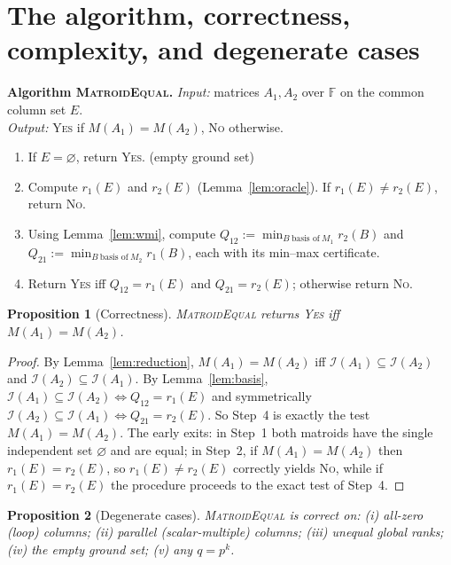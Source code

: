 \documentclass{amsart}
\theoremstyle{plain}
\newtheorem{proposition}{Proposition}
\theoremstyle{definition}
\newcommand{\I}{\mathcal{I}}
\newcommand{\F}{\mathbb{F}}
\begin{document}
\section{The algorithm, correctness, complexity, and degenerate cases}\label{sec:algorithm}

\noindent\textbf{Algorithm \textsc{MatroidEqual}.}\quad
\emph{Input:} matrices $A_1,A_2$ over $\F$ on the common column set $E$.\\
\emph{Output:} \textsc{Yes} if $M(A_1)=M(A_2)$, \textsc{No} otherwise.
\begin{enumerate}
\item If $E=\varnothing$, return \textsc{Yes}. \hfill(empty ground set)
\item Compute $r_1(E)$ and $r_2(E)$ (Lemma~\ref{lem:oracle}). If $r_1(E)\ne r_2(E)$, return
\textsc{No}.
\item Using Lemma~\ref{lem:wmi}, compute $Q_{12}:=\min_{B\ \text{basis of}\ M_1}r_2(B)$ and
$Q_{21}:=\min_{B\ \text{basis of}\ M_2}r_1(B)$, each with its min--max certificate.
\item Return \textsc{Yes} iff $Q_{12}=r_1(E)$ and $Q_{21}=r_2(E)$; otherwise return \textsc{No}.
\end{enumerate}

\begin{proposition}[Correctness]\label{prop:correct}
\textsc{MatroidEqual} returns \textsc{Yes} iff $M(A_1)=M(A_2)$.
\end{proposition}

\begin{proof}
By Lemma~\ref{lem:reduction}, $M(A_1)=M(A_2)$ iff $\I(A_1)\subseteq\I(A_2)$ and
$\I(A_2)\subseteq\I(A_1)$. By Lemma~\ref{lem:basis}, $\I(A_1)\subseteq\I(A_2)\iff Q_{12}=r_1(E)$
and symmetrically $\I(A_2)\subseteq\I(A_1)\iff Q_{21}=r_2(E)$. So Step~4 is exactly the test
$M(A_1)=M(A_2)$. The early exits: in Step~1 both matroids have the single independent set
$\varnothing$ and are equal; in Step~2, if $M(A_1)=M(A_2)$ then $r_1(E)=r_2(E)$, so
$r_1(E)\ne r_2(E)$ correctly yields \textsc{No}, while if $r_1(E)=r_2(E)$ the procedure proceeds
to the exact test of Step~4. \qedhere
\end{proof}

\begin{proposition}[Degenerate cases]\label{prop:degenerate}
\textsc{MatroidEqual} is correct on: (i) all-zero (loop) columns; (ii) parallel
(scalar-multiple) columns; (iii) unequal global ranks; (iv) the empty ground set; (v) any
$q=p^k$.
\end{proposition}
\end{document}

